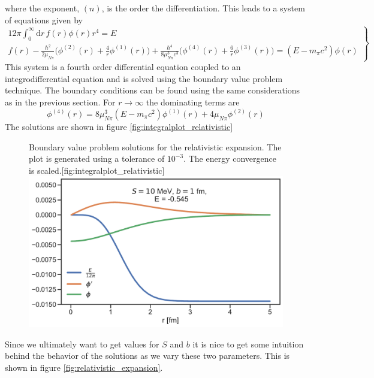  where the exponent, $(n)$, is the order the differentiation. This leads to a system of equations given by
 \begin{equation} \label{systemrel}
 \left.
    \begin{array}{ll}
            12\pi \int_0^\infty  \text{d}r \, f(r) \phi(r) r^4  = E \\
               f(r)-\frac{\hbar^2}{2\mu_{N\pi}}\big( \phi^{(2)}(r)+\frac{4}{r}\phi^{(1)}(r) \big)+\frac{\hbar^4}{8\mu_{N\pi}^3 c^3}\big(\phi^{(4)}(r)+\frac{6}{r}\phi^{(3)}(r)\big)=(E-m_\pi c^2)\phi(r)
    \end{array}
\right \} 
\end{equation}
This system is a fourth order differential equation coupled to an integrodifferential equation and is solved using the boundary value problem technique. The boundary conditions can be found using the same considerations as in the previous section. For $r\rightarrow \infty$ the dominating terms are 
\begin{equation}
    \phi^{(4)}(r) = 8\mu_{N\pi}^3(E-m_\pi c^2) \phi^{(1)}(r)+4\mu_{N\pi} \phi^{(2)}(r)
\end{equation}
The solutions are shown in figure \ref{fig:integralplot_relativistic}
\begin{figure}[H]
    \begin{sidecaption}{Boundary value problem solutions for the relativistic expansion. The plot is generated using a tolerance of $10^{-3}$. The energy convergence is scaled.}[fig:integralplot_relativistic]
    \includegraphics[width=\linewidth]{Figures/Integralplot_relativistic.pdf}
    \end{sidecaption}
\end{figure}
Since we ultimately want to get values for $S$ and $b$ it is nice to get some intuition behind the behavior of the solutions as we vary these two parameters. This is shown in figure \ref{fig:relativistic_expansion}.
